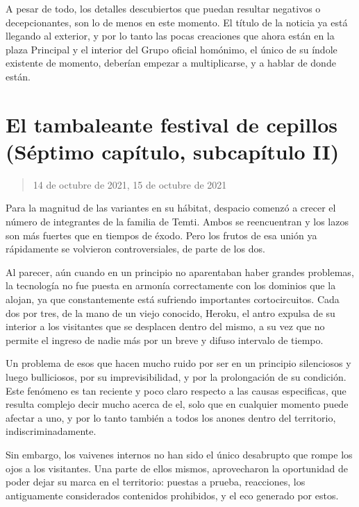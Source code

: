 \documentclass[
  spanish,
]{book}
\begin{document}
A pesar de todo, los detalles descubiertos que puedan resultar negativos o decepcionantes, son lo de menos en este momento. El título de la noticia ya está llegando al exterior, y por lo tanto las pocas creaciones que ahora están en la plaza Principal y el interior del Grupo oficial homónimo, el único de su índole existente de momento, deberían empezar a multiplicarse, y a hablar de donde están.

\hypertarget{el-tambaleante-festival-de-cepillos-suxe9ptimo-capuxedtulo-subcapuxedtulo-ii}{%
\section{El tambaleante festival de cepillos (Séptimo capítulo, subcapítulo II)}\label{el-tambaleante-festival-de-cepillos-suxe9ptimo-capuxedtulo-subcapuxedtulo-ii}}

\begin{quote}
14 de octubre de 2021, 15 de octubre de 2021
\end{quote}

Para la magnitud de las variantes en su hábitat, despacio comenzó a crecer el número de integrantes de la familia de Temti. Ambos se reencuentran y los lazos son más fuertes que en tiempos de éxodo. Pero los frutos de esa unión ya rápidamente se volvieron controversiales, de parte de los dos.

Al parecer, aún cuando en un principio no aparentaban haber grandes problemas, la tecnología no fue puesta en armonía correctamente con los dominios que la alojan, ya que constantemente está sufriendo importantes cortocircuitos. Cada dos por tres, de la mano de un viejo conocido, Heroku, el antro expulsa de su interior a los visitantes que se desplacen dentro del mismo, a su vez que no permite el ingreso de nadie más por un breve y difuso intervalo de tiempo.

Un problema de esos que hacen mucho ruido por ser en un principio silenciosos y luego bulliciosos, por su imprevisibilidad, y por la prolongación de su condición. Este fenómeno es tan reciente y poco claro respecto a las causas especificas, que resulta complejo decir mucho acerca de el, solo que en cualquier momento puede afectar a uno, y por lo tanto también a todos los anones dentro del territorio, indiscriminadamente.

Sin embargo, los vaivenes internos no han sido el único desabrupto que rompe los ojos a los visitantes. Una parte de ellos mismos, aprovecharon la oportunidad de poder dejar su marca en el territorio: puestas a prueba, reacciones, los antiguamente considerados contenidos prohibidos, y el eco generado por estos.
\end{document}
